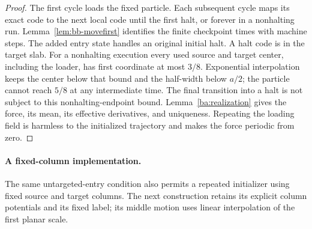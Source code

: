 \begin{proof}
The first cycle loads the fixed particle.  Each subsequent cycle maps
its exact code to the next local code until the first halt, or forever
in a nonhalting run.  Lemma~\ref{lem:bb-movefirst} identifies the finite
checkpoint times with machine steps.  The added entry state handles an
original initial halt.  A halt code is in the target slab.  For a
nonhalting execution every used source and target center, including the
loader, has first coordinate at most $3/8$.  Exponential interpolation
keeps the center below that bound and the half-width below $a/2$;
the particle cannot reach $5/8$ at any intermediate time.  The final
transition into a halt is not subject to this nonhalting-endpoint bound.
Lemma~\ref{ba:realization} gives the force, its mean, its effective
derivatives, and uniqueness.  Repeating the loading field is harmless
to the initialized trajectory and makes the force periodic from zero.
\end{proof}

\paragraph{A fixed-column implementation.}\label{bc:unit-periodic-section}
The same untargeted-entry condition also permits a repeated initializer
using fixed source and target columns. The next construction retains its
explicit column potentials and its fixed label; its middle motion uses
linear interpolation of the first planar scale.

